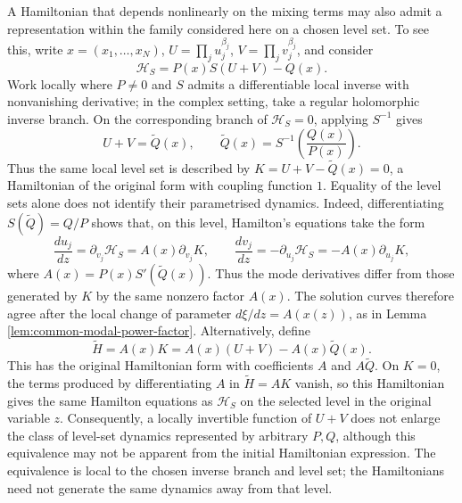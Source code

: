 \documentclass[11pt,a4paper]{article}
\numberwithin{equation}{section}
\begin{document}
A Hamiltonian that depends nonlinearly on the mixing terms may also admit a representation within the family considered here on a chosen level set.
To see this, write $x=(x_1,\ldots,x_N)$, $U=\prod_j u_j^{\beta_j}$, $V=\prod_j v_j^{\beta_j}$, and consider
\begin{equation}
    \mathcal H_S=P(x)S(U+V)-Q(x).
\end{equation}
Work locally where $P\ne0$ and $S$ admits a differentiable local inverse with nonvanishing derivative; in the complex setting, take a regular holomorphic inverse branch.
On the corresponding branch of $\mathcal H_S=0$, applying $S^{-1}$ gives
\begin{equation}
    U+V=\widetilde Q(x),
    \qquad \widetilde Q(x)=S^{-1}\!\left(\frac{Q(x)}{P(x)}\right).
\end{equation}
Thus the same local level set is described by $K=U+V-\widetilde Q(x)=0$, a Hamiltonian of the original form with coupling function $1$.
Equality of the level sets alone does not identify their parametrised dynamics.
Indeed, differentiating $S(\widetilde Q)=Q/P$ shows that, on this level, Hamilton's equations take the form
\begin{equation}
    \frac{du_j}{dz}=\partial_{v_j}\mathcal H_S=A(x)\partial_{v_j}K,
    \qquad
    \frac{dv_j}{dz}=-\partial_{u_j}\mathcal H_S=-A(x)\partial_{u_j}K,
    \label{eq:nonlinear-mixing-vector-factor}
\end{equation}
where $A(x)=P(x)S'(\widetilde Q(x))$. Thus the mode derivatives differ from those generated by $K$ by the same nonzero factor $A(x)$. The solution curves therefore agree after the local change of parameter $d\xi/dz=A(x(z))$, as in Lemma \ref{lem:common-modal-power-factor}.
Alternatively, define
\begin{equation}
    \widetilde H=A(x)K
    =A(x)(U+V)-A(x)\widetilde Q(x).
\end{equation}
This has the original Hamiltonian form with coefficients $A$ and $A\widetilde Q$. On $K=0$, the terms produced by differentiating $A$ in $\widetilde H=AK$ vanish, so this Hamiltonian gives the same Hamilton equations as $\mathcal H_S$ on the selected level in the original variable $z$.
Consequently, a locally invertible function of $U+V$ does not enlarge the class of level-set dynamics represented by arbitrary $P,Q$, although this equivalence may not be apparent from the initial Hamiltonian expression.
The equivalence is local to the chosen inverse branch and level set; the Hamiltonians need not generate the same dynamics away from that level.
\end{document}
